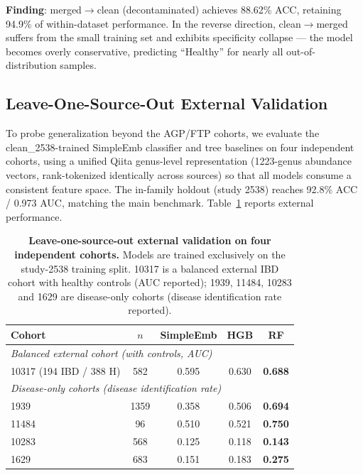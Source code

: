 \documentclass[11pt,a4paper]{article}
\begin{document}
\textbf{Finding}: merged$\rightarrow$clean (decontaminated) achieves 88.62\% ACC, retaining 94.9\% of within-dataset performance. In the reverse direction, clean$\rightarrow$merged suffers from the small training set and exhibits specificity collapse --- the model becomes overly conservative, predicting ``Healthy'' for nearly all out-of-distribution samples.


\subsection{Leave-One-Source-Out External Validation}

To probe generalization beyond the AGP/FTP cohorts, we evaluate the clean\_2538-trained SimpleEmb classifier and tree baselines on four independent cohorts, using a unified Qiita genus-level representation (1223-genus abundance vectors, rank-tokenized identically across sources) so that all models consume a consistent feature space. The in-family holdout (study 2538) reaches 92.8\% ACC / 0.973 AUC, matching the main benchmark. Table~\ref{tab:external} reports external performance.

\begin{table}[ht]
\centering
\caption{\textbf{Leave-one-source-out external validation on four independent cohorts.}
Models are trained exclusively on the study-2538 training split. 10317 is a balanced external IBD cohort with healthy controls (AUC reported); 1939, 11484, 10283 and 1629 are disease-only cohorts (disease identification rate reported).}
\label{tab:external}
\begin{tabular}{lcccc}
\toprule
\textbf{Cohort} & \textbf{$n$} & \textbf{SimpleEmb} & \textbf{HGB} & \textbf{RF} \\
\midrule
\multicolumn{5}{l}{\textit{Balanced external cohort (with controls, AUC)}} \\
10317 (194 IBD / 388 H) & 582 & 0.595 & 0.630 & \textbf{0.688} \\
\midrule
\multicolumn{5}{l}{\textit{Disease-only cohorts (disease identification rate)}} \\
1939 & 1359 & 0.358 & 0.506 & \textbf{0.694} \\
11484 & 96 & 0.510 & 0.521 & \textbf{0.750} \\
10283 & 568 & 0.125 & 0.118 & \textbf{0.143} \\
1629 & 683 & 0.151 & 0.183 & \textbf{0.275} \\
\bottomrule
\end{tabular}
\end{table}
\end{document}
